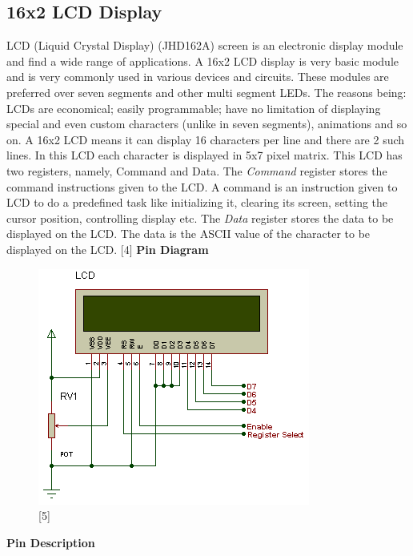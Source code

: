 \documentclass[11pt,a4paper]{article}
\begin{document}
	
	\subsection{16x2 LCD Display}
	\vspace{0.3cm}
	LCD (Liquid Crystal Display) (JHD162A) screen is an electronic display module and find a wide range of applications. A 16x2 LCD display is very basic module and is very commonly used in various devices and circuits. These modules are preferred over seven segments and other multi segment LEDs. The reasons being: LCDs are economical; easily programmable; have no limitation of displaying special and even custom characters (unlike in seven segments), animations and so on.
	\flushleft
	A 16x2 LCD means it can display 16 characters per line and there are 2 such lines. In this LCD each character is displayed in 5x7 pixel matrix. This LCD has two registers, namely, Command and Data. The \textit{Command} register stores the command instructions given to the LCD. A command is an instruction given to LCD to do a predefined task like initializing it, clearing its screen, setting the cursor position, controlling display etc. The \textit{Data} register stores the data to be displayed on the LCD. The data is the ASCII value of the character to be displayed on the LCD. [4]
	\vspace{0.3cm}
	\textbf{Pin Diagram}
    \begin{figure}[h!]
    	\includegraphics[scale=0.9]{lcd.png}
    	\centering
    	\caption{[5]}
    \end{figure} 
    	
	\newpage
	\flushleft
	\textbf{Pin Description }
	\vspace{0.3cm}
	
\end{document}
